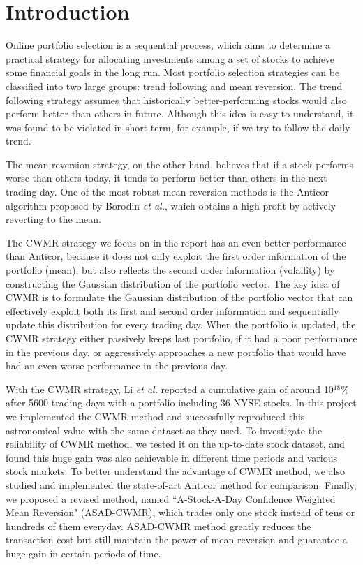 \section{Introduction}
Online portfolio selection is a sequential process, which aims to determine a practical strategy for allocating investments among a set of stocks to achieve some financial goals in the long run. Most portfolio selection strategies can be classified into two large groups: trend following and mean reversion. The trend following strategy assumes that historically better-performing stocks would also perform better than others in future. Although this idea is easy to understand, it was found to be violated in short term, for example, if we try to follow the daily trend\cite{JOFI:JOFI5110}.

The mean reversion strategy, on the other hand, believes that if a stock performs worse than others today, it tends to perform better than others in the next trading day. One of the most robust mean reversion methods is the Anticor algorithm proposed by Borodin \emph{et al.}, which obtains a high profit by actively reverting to the mean\cite{AntiCor}.

The CWMR strategy we focus on in the report has an even better performance than Anticor, because it does not only exploit the first order information of the portfolio (mean), but also reflects the second order information (volaility) by constructing the Gaussian distribution of the portfolio vector\cite{OnlinePortfolio}. The key idea of CWMR is to formulate the Gaussian distribution of the portfolio vector that can effectively exploit both its first and second order information and sequentially update this distribution for every trading day. When the portfolio is updated, the CWMR strategy either passively keeps last portfolio, if it had a poor performance in the previous day, or aggressively approaches a new portfolio that would have had an even worse performance in the previous day.

With the CWMR strategy, Li \emph{et al.} reported a cumulative gain of around 10$^{18}$\% after 5600 trading days with a portfolio including 36 NYSE stocks. In this project we implemented the CWMR method and successfully reproduced this astronomical value with the same dataset as they used. To investigate the reliability of CWMR method, we tested it on the up-to-date stock dataset, and found this huge gain was also achievable in different time periods and various stock markets. To better understand the advantage of CWMR method, we also studied and implemented the state-of-art Anticor method for comparison. Finally, we proposed a revised method, named ``A-Stock-A-Day Confidence Weighted Mean Reversion" (ASAD-CWMR), which trades only one stock instead of tens or hundreds of them everyday. ASAD-CWMR method greatly reduces the transaction cost but still maintain the power of mean reversion and guarantee a huge gain in certain periods of time.

